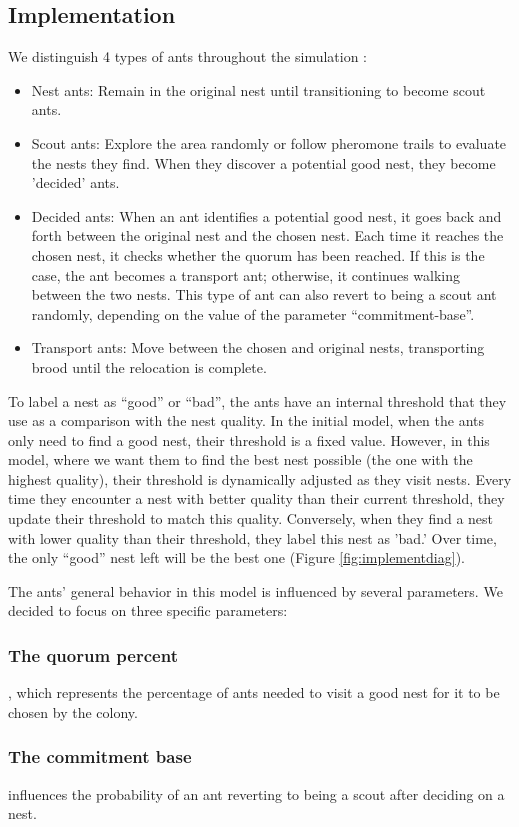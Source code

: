 \documentclass[9pt]{pnas-new}
\begin{document}
\subsection*{Implementation}
We distinguish 4 types of ants throughout the simulation :
\begin{itemize}
    \item Nest ants: Remain in the original nest until transitioning to become scout ants.
    \item Scout ants: Explore the area randomly or follow pheromone trails to evaluate the nests they find. When they discover a potential good nest, they become 'decided' ants.
    \item Decided ants: When an ant identifies a potential good nest, it goes back and forth between the original nest and the chosen nest. Each time it reaches the chosen nest, it checks whether the quorum has been reached. If this is the case, the ant becomes a transport ant; otherwise, it continues walking between the two nests. This type of ant can also revert to being a scout ant randomly, depending on the value of the parameter “commitment-base”.
    \item Transport ants: Move between the chosen and original nests, transporting brood until the relocation is complete.
\end{itemize}
To label a nest as “good” or “bad”, the ants have an internal threshold that they use as a comparison with the nest quality. In the initial model, when the ants only need to find a good nest, their threshold is a fixed value. However, in this model, where we want them to find the best nest possible (the one with the highest quality), their threshold is dynamically adjusted as they visit nests. Every time they encounter a nest with better quality than their current threshold, they update their threshold to match this quality. Conversely, when they find a nest with lower quality than their threshold, they label this nest as 'bad.' Over time, the only “good” nest left will be the best one (Figure \ref{fig:implementdiag}).

The ants' general behavior in this model is influenced by several parameters. We decided to focus on three specific parameters:
\subsubsection*{The quorum percent}, which represents the percentage of ants needed to visit a good nest for it to be chosen by the colony.
\subsubsection*{The commitment base} influences the probability of an ant reverting to being a scout after deciding on a nest.
\end{document}
